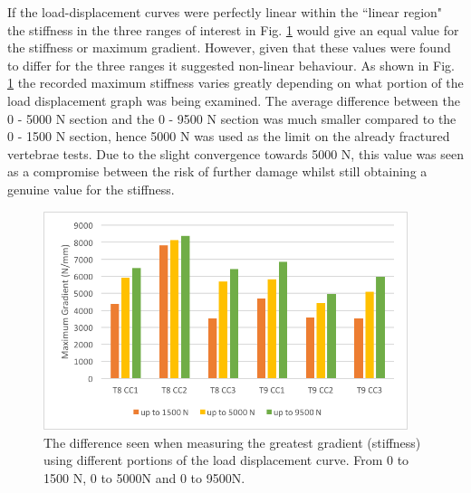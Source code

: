 If the load-displacement curves were perfectly linear within the ``linear region" the stiffness in the three ranges of interest in Fig. \ref{fig:barchartcompgrads} would give an equal value for the stiffness or maximum gradient. However, given that these values were found to differ for the three ranges it suggested non-linear behaviour.
 As shown in Fig. \ref{fig:barchartcompgrads} the recorded maximum stiffness varies greatly depending on what portion of the load displacement graph was being examined. The average difference between the 0 - 5000 N section and the 0 - 9500 N section was much smaller compared to the 0 - 1500 N section, hence 5000 N was used as the limit on the already fractured vertebrae tests. Due to the slight convergence towards 5000 N, this value was seen as a compromise between the risk of further damage whilst still obtaining a genuine value for the stiffness.


\begin{figure}[ht!]

\centering
\includegraphics[width=4.18472in]{images/barchartCompGrads.png}
\caption{The difference seen when measuring the greatest gradient (stiffness) using different portions of the load displacement curve. From 0 to 1500 N, 0 to 5000N and 0 to 9500N.}
\label{fig:barchartcompgrads}
\end{figure}


